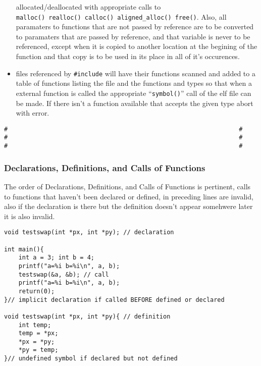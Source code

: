 \begin{itemize}
  allocated/deallocated with appropriate calls to
  \texttt{malloc()\ realloc()\ calloc()\ aligned\_alloc()\ free()}.
  Also, all paramaters to functions that are not passed by reference are
  to be converted to paramaters that are passed by reference, and that
  variable is never to be referenced, except when it is copied to
  another location at the begining of the function and that copy is to
  be used in its place in all of it's occurences.
\item
  files referenced by \texttt{\#include} will have their functions
  scanned and added to a table of functions listing the file and the
  functions and types so that when a external function is called the
  appropriate ``\texttt{symbol()}'' call of the elf file can be made. If
  there isn't a function available that accepts the given type abort
  with error.
\end{itemize}

\begin{verbatim}
#                                                                #
#                                                                #
#                                                                #
\end{verbatim}

\hypertarget{declarations-definitions-and-calls-of-functions}{%
\subsubsection{Declarations, Definitions, and Calls of
Functions}\label{declarations-definitions-and-calls-of-functions}}

The order of Declarations, Definitions, and Calls of Functions is
pertinent, calls to functions that haven't been declared or defined, in
preceding lines are invalid, also if the declaration is there but the
definition doesn't appear somehwere later it is also invalid.

\begin{verbatim}
void testswap(int *px, int *py); // declaration

int main(){
    int a = 3; int b = 4;
    printf("a=%i b=%i\n", a, b);
    testswap(&a, &b); // call
    printf("a=%i b=%i\n", a, b);
    return(0);
}// implicit declaration if called BEFORE defined or declared

void testswap(int *px, int *py){ // definition
    int temp;
    temp = *px;
    *px = *py;
    *py = temp;
}// undefined symbol if declared but not defined
\end{verbatim}

